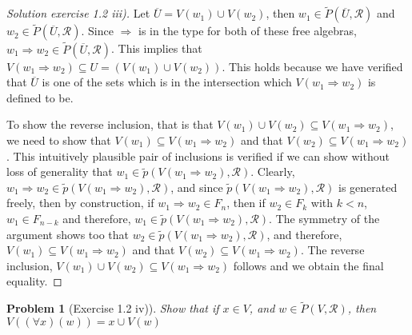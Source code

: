 \documentclass{article}
\theoremstyle{problemstyle}
\newtheorem{problem}{Problem}
\begin{document}
\begin{proof}[Solution exercise 1.2 iii)]
Let $\overline{U} = V(w_1) \cup V(w_2)$, then $w_1 \in \widetilde{P}(\overline{U},\mathscr{R})$ and $w_2 \in \widetilde{P}(\overline{U},\mathscr{R})$. Since $\Rightarrow$ is in the type for both of these free algebras, $w_1 \Rightarrow w_2 \in \widetilde{P}(\overline{U},\mathscr{R})$. This implies that $V(w_1 \Rightarrow w_2) \subseteq U = (V(w_1) \cup V(w_2))$. This holds because we have verified that $\overline{U}$ is one of the sets which is in the intersection which $V(w_1 \Rightarrow w_2)$ is defined to be. 

To show the reverse inclusion, that is that $V(w_1) \cup V(w_2) \subseteq V(w_1 \Rightarrow w_2)$, we need to show that $V(w_1) \subseteq V(w_1 \Rightarrow w_2)$ and that $V(w_2) \subseteq V(w_1 \Rightarrow w_2)$. This intuitively plausible pair of inclusions is verified if we can show without loss of generality that $w_1 \in \widetilde{p}(V(w_1 \Rightarrow w_2), \mathscr{R})$. Clearly, $w_1 \Rightarrow w_2 \in \widetilde{p}(V(w_1 \Rightarrow w_2), \mathscr{R})$, and since $\widetilde{p}(V(w_1 \Rightarrow w_2), \mathscr{R})$ is generated freely, then by construction, if $w_1 \Rightarrow w_2 \in F_n$, then if $w_2 \in F_k$ with $k < n$, $w_1 \in F_{n-k}$ and therefore, $w_1 \in \widetilde{p}(V(w_1 \Rightarrow w_2), \mathscr{R})$. The symmetry of the argument shows too that $w_2 \in \widetilde{p}(V(w_1 \Rightarrow w_2), \mathscr{R})$, and therefore, $V(w_1) \subseteq V(w_1 \Rightarrow w_2)$ and that $V(w_2) \subseteq V(w_1 \Rightarrow w_2)$. The reverse inclusion, $V(w_1) \cup V(w_2) \subseteq V(w_1 \Rightarrow w_2)$ follows and we obtain the final equality. 
\end{proof}

\begin{problem}[Exercise 1.2 iv)] 
Show that if $x \in V$, and $w \in \widetilde{P}(V,\mathscr{R})$, then $V((\forall x)(w)) = {x} \cup V(w)$
\end{problem}
\end{document}
